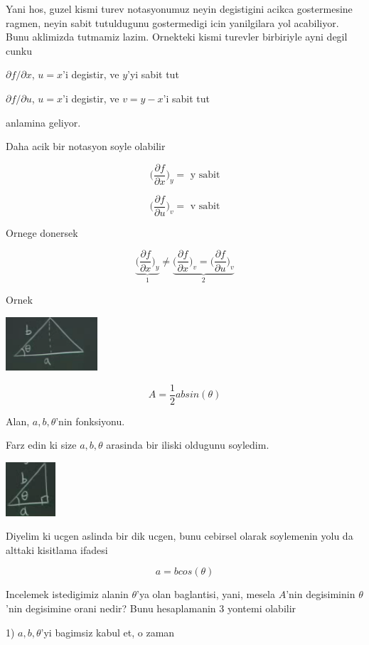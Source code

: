 \documentclass[12pt,fleqn]{article}
\begin{document}
Yani hos, guzel kismi turev notasyonumuz neyin degistigini acikca
gostermesine ragmen, neyin sabit tutuldugunu gostermedigi icin yanilgilara
yol acabiliyor. Bunu aklimizda tutmamiz lazim. Ornekteki kismi turevler
birbiriyle ayni degil cunku 

$\partial f/\partial x$, $u=x$'i degistir, ve $y$'yi sabit tut

$\partial f/\partial u$, $u=x$'i degistir, ve $v = y-x$'i sabit tut

anlamina geliyor. 

Daha acik bir notasyon soyle olabilir

\[ 
\bigg( \frac{\partial f}{\partial x}  \bigg)_y = \textrm { y sabit}
 \]

\[ 
\bigg( \frac{\partial f}{\partial u}  \bigg)_v = \textrm { v sabit}
 \]

Ornege donersek

\[ 
\underbrace{
\bigg( \frac{\partial f}{\partial x}  \bigg)_y 
}_{1} 
\ne 
\underbrace{
\bigg( \frac{\partial f}{\partial x}  \bigg)_v = 
\bigg( \frac{\partial f}{\partial u}  \bigg)_v 
}_{2}
 \]

Ornek

\includegraphics[height=2cm]{14_1.png}

\[ A = \frac{1}{2}absin(\theta) \]

Alan, $a,b,\theta$'nin fonksiyonu. 

Farz edin ki size $a,b,\theta$ arasinda bir iliski oldugunu soyledim. 

\includegraphics[height=2cm]{14_2.png}

Diyelim ki ucgen aslinda bir dik ucgen, bunu cebirsel olarak soylemenin
yolu da alttaki kisitlama ifadesi

\[ a = bcos(\theta) \]

Incelemek istedigimiz alanin $\theta$'ya olan baglantisi, yani, mesela
$A$'nin degisiminin $\theta$'nin degisimine orani nedir? Bunu hesaplamanin
3 yontemi olabilir

1) $a,b,\theta$'yi bagimsiz kabul et, o zaman
\end{document}
